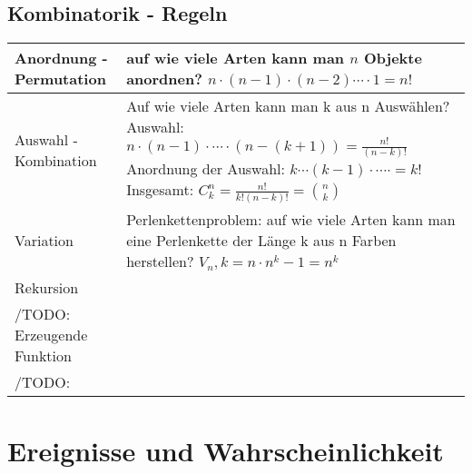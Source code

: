 \documentclass[margin=normal]{tex/hsrzf}
\begin{document}
\subsection{Kombinatorik - Regeln}  
\begin{tabular}{|l| p{10cm}|}
    \hline Anordnung - Permutation & 
    auf wie viele Arten kann man $n$ Objekte anordnen? \newline
    $ n \cdot (n-1) \cdot (n-2) \cdots \cdot 1 = n! $ \\
    \hline Auswahl - Kombination & 
    Auf wie viele Arten kann man k aus n Auswählen? \newline
    Auswahl: $ n \cdot (n-1) \cdot \cdots \cdot (n-(k+1)) = \frac{n!}{(n-k)!}$
    Anordnung der Auswahl:  $k \cdots (k-1) \cdot \cdots \cdot = k!$
    Insgesamt: $ C^n_k = \frac{n!}{k!(n-k)!} = \binom{n}{k} $ \\
    \hline Variation & 
    Perlenkettenproblem:
    auf wie viele Arten kann man eine Perlenkette der Länge k aus n Farben herstellen? \newline
    $V_n,k = n \cdot n^k-1 = n^k$\\
    \hline Rekursion &
    \\ /TODO:
    \hline Erzeugende Funktion &
    \\ /TODO:
    \hline
\end{tabular}

\section{Ereignisse und Wahrscheinlichkeit}
\end{document}
